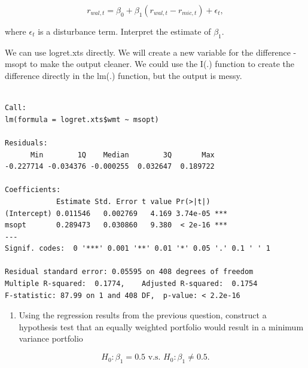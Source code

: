 \documentclass[
  a4paper,
  DIV=11,
  numbers=noendperiod]{scrartcl}
\newenvironment{Shaded}{\begin{snugshade}}{\end{snugshade}}
\newcommand{\FunctionTok}[1]{\textcolor[rgb]{0.28,0.35,0.67}{#1}}
\newcommand{\NormalTok}[1]{\textcolor[rgb]{0.00,0.23,0.31}{#1}}
\newcommand{\OtherTok}[1]{\textcolor[rgb]{0.00,0.23,0.31}{#1}}
\newcommand{\SpecialCharTok}[1]{\textcolor[rgb]{0.37,0.37,0.37}{#1}}
\providecommand{\tightlist}{%
  \setlength{\itemsep}{0pt}\setlength{\parskip}{0pt}}
\begin{document}
\[r_{wal,t}=\beta _{0}+\beta _{1}\left( r_{wal,t}-r_{mic,t}\right) +\epsilon_{t},\]

where \(\epsilon _{t}\) is a disturbance term. Interpret the estimate of
\(\beta _{1}\).

\textcolor{awesome}{We can use logret.xts directly. We will create a new variable for the difference - msopt to make the output cleaner. We could use the I(.) function to create the difference directly in the lm(.) function, but the output is messy.}

\begin{Shaded}
\end{Shaded}

\begin{verbatim}

Call:
lm(formula = logret.xts$wmt ~ msopt)

Residuals:
      Min        1Q    Median        3Q       Max 
-0.227714 -0.034376 -0.000255  0.032647  0.189722 

Coefficients:
            Estimate Std. Error t value Pr(>|t|)    
(Intercept) 0.011546   0.002769   4.169 3.74e-05 ***
msopt       0.289473   0.030860   9.380  < 2e-16 ***
---
Signif. codes:  0 '***' 0.001 '**' 0.01 '*' 0.05 '.' 0.1 ' ' 1

Residual standard error: 0.05595 on 408 degrees of freedom
Multiple R-squared:  0.1774,    Adjusted R-squared:  0.1754 
F-statistic: 87.99 on 1 and 408 DF,  p-value: < 2.2e-16
\end{verbatim}

\begin{enumerate}
\def\labelenumi{\arabic{enumi}.}
\setcounter{enumi}{4}
\tightlist
\item
  Using the regression results from the previous question, construct a
  hypothesis test that an equally weighted portfolio would result in a
  minimum variance portfolio
\end{enumerate}

\[H_{0}:\beta _{1}=0.5\text{ v.s. }H_{0}:\beta _{1}\neq 0.5.\]
\end{document}
